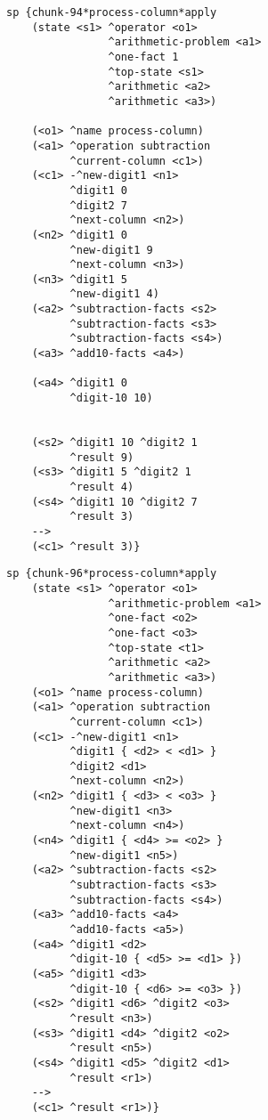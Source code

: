 \begin{figure}
	{\footnotesize
	\begin{multicols}{2}
        	\begin{verbatim}
sp {chunk-94*process-column*apply              
    (state <s1> ^operator <o1>                
                ^arithmetic-problem <a1>      
                ^one-fact 1                 
                ^top-state <s1>
                ^arithmetic <a2>
                ^arithmetic <a3>)
                
    (<o1> ^name process-column)
    (<a1> ^operation subtraction
          ^current-column <c1>)
    (<c1> -^new-digit1 <n1>
          ^digit1 0
          ^digit2 7
          ^next-column <n2>)
    (<n2> ^digit1 0 
          ^new-digit1 9
          ^next-column <n3>)
    (<n3> ^digit1 5  
          ^new-digit1 4)
    (<a2> ^subtraction-facts <s2>
          ^subtraction-facts <s3>
          ^subtraction-facts <s4>)
    (<a3> ^add10-facts <a4>)
    
    (<a4> ^digit1 0 
          ^digit-10 10)
          
          
    (<s2> ^digit1 10 ^digit2 1 
          ^result 9)
    (<s3> ^digit1 5 ^digit2 1 
          ^result 4)
    (<s4> ^digit1 10 ^digit2 7
          ^result 3)
    -->
    (<c1> ^result 3)}
        	\end{verbatim}
        	\columnbreak
        	\begin{verbatim}
sp {chunk-96*process-column*apply
    (state <s1> ^operator <o1>
                ^arithmetic-problem <a1>
                ^one-fact <o2>
                ^one-fact <o3>
                ^top-state <t1>
                ^arithmetic <a2>
                ^arithmetic <a3>)
    (<o1> ^name process-column)
    (<a1> ^operation subtraction
          ^current-column <c1>)
    (<c1> -^new-digit1 <n1>
          ^digit1 { <d2> < <d1> } 
          ^digit2 <d1>
          ^next-column <n2>)
    (<n2> ^digit1 { <d3> < <o3> } 
          ^new-digit1 <n3>
          ^next-column <n4>)
    (<n4> ^digit1 { <d4> >= <o2> } 
          ^new-digit1 <n5>)
    (<a2> ^subtraction-facts <s2>
          ^subtraction-facts <s3>
          ^subtraction-facts <s4>)
    (<a3> ^add10-facts <a4>
          ^add10-facts <a5>)
    (<a4> ^digit1 <d2> 
          ^digit-10 { <d5> >= <d1> })
    (<a5> ^digit1 <d3> 
          ^digit-10 { <d6> >= <o3> })
    (<s2> ^digit1 <d6> ^digit2 <o3> 
          ^result <n3>)
    (<s3> ^digit1 <d4> ^digit2 <o2>
          ^result <n5>)
    (<s4> ^digit1 <d5> ^digit2 <d1> 
          ^result <r1>)
    -->
    (<c1> ^result <r1>)}
        	\end{verbatim}
	\end{multicols}
	}
	\label{chunk-comparison}
\end{figure}

